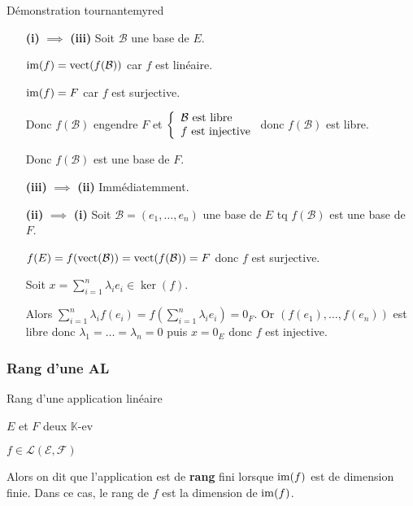     \begin{demo}{Démonstration tournante}{myred}
        \begin{itemize}[leftmargin=3cm]
            \item[\textbf{(i)} $\implies$ \textbf{(iii)}] Soit $\mathcal{B}$ une base de $E$.
            
            $\operatorname{im}(f) = \operatorname{vect}(f(\mathcal{B}))$ car $f$ est linéaire. 
            
            $\operatorname{im}(f) = F$ car $f$ est surjective.
            
            Donc $f(\mathcal{B})$ engendre $F$ et $\et{\mathcal{B} \text{ est libre}}{f \text{ est injective}}$ donc $f(\mathcal{B})$ est libre.
            
            Donc $f(\mathcal{B})$ est une base de $F$.
            \item[\textbf{(iii)} $\implies$ \textbf{(ii)}] Immédiatemment.
            \item[\textbf{(ii)} $\implies$ \textbf{(i)}] Soit $\mathcal{B} = (e_1, \ldots, e_n) $ une base de $E$ tq $f(\mathcal{B})$ est une base de $F$.
            
            $f(E) = f(\operatorname{vect}(\mathcal{B})) = \operatorname{vect}(f(\mathcal{B})) = F$ donc $f$ est surjective.
            
            Soit $x = \sum\limits_{i=1}^n \lambda_i e_i \in \ker(f)$.
            
            Alors $\sum\limits_{i=1}^n \lambda_i f(e_i) = f \left( \sum\limits_{i=1}^n \lambda_i e_i\right) = 0_F$. Or $(f(e_1),\ldots, f(e_n))$ est libre donc $\lambda_1 = \ldots = \lambda_n = 0$ puis $x = 0_E$ donc $f$ est injective.
        \end{itemize}
    \end{demo}

    \subsubsection{Rang d’une AL}

    \begin{defi}{Rang d’une application linéaire}{}
        \begin{soient}
            \item $E$ et $F$ deux $\mathbb{K}$-ev
            \item $f \in \mathcal{L}(\mathcal{E},\mathcal{F})$
        \end{soient}
    
        Alors on dit que l’application est de \textbf{rang} fini lorsque $\operatorname{im}(f)$ est de dimension finie. Dans ce cas, le rang de $f$ est la dimension de $\operatorname{im}(f)$.
    \end{defi}
    
